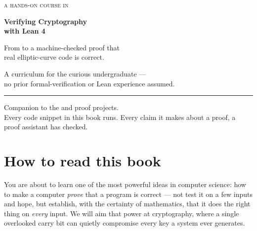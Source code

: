 \documentclass[11pt]{report}
\begin{document}
\begin{titlepage}
\pagecolor{ink}\color{paper}
\vspace*{3.2cm}
{\fontsize{15}{18}\selectfont\scshape\color{accent} a hands-on course in\par}
\vspace{0.5cm}
{\fontsize{40}{44}\selectfont\bfseries Verifying Cryptography\\[2pt] with Lean 4\par}
\vspace{0.8cm}
{\fontsize{15}{20}\selectfont\color{paper}
From  to a machine-checked proof that\\ real elliptic-curve code is correct.\par}
\vfill
{\large\color{paper} A curriculum for the curious undergraduate ---\\
no prior formal-verification or Lean experience assumed.\par}
\vspace{0.8cm}
{\color{ink2}\rule{\linewidth}{0.6pt}}
\vspace{0.3cm}
{\small\color{paper} Companion to the  and 
proof projects. \\ Every code snippet in this book runs. Every claim it makes about a proof, a proof assistant has checked.\par}
\end{titlepage}
\restoregeometry
\pagecolor{paper}\color{ink}

\chapter*{How to read this book}

You are about to learn one of the most powerful ideas in computer science: how
to make a computer \emph{prove} that a program is correct --- not test it on a
few inputs and hope, but establish, with the certainty of mathematics, that it
does the right thing on \emph{every} input. We will aim that power at
cryptography, where a single overlooked carry bit can quietly compromise every
key a system ever generates.
\end{document}
